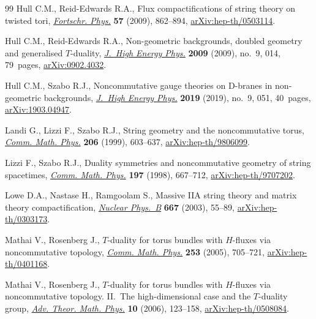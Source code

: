 \documentclass[10pt,a4paper]{amsart}
\numberwithin{equation}{section}
\begin{document}
\begin{thebibliography}{99}
Hull C.M., Reid-Edwards R.A., Flux compactifications of string theory on
 twisted tori, \href{https://doi.org/10.1002/prop.200900076}{\textit{Fortschr. Phys.}} \textbf{57} (2009), 862--894,
 \href{https://arxiv.org/abs/hep-th/0503114}{arXiv:hep-th/0503114}.

Hull C.M., Reid-Edwards R.A., Non-geometric backgrounds, doubled geometry and
 generalised {$T$}-duality, \href{https://doi.org/10.1088/1126-6708/2009/09/014}{\textit{J.~High Energy Phys.}} \textbf{2009}
 (2009), no.~9, 014, 79~pages, \href{https://arxiv.org/abs/0902.4032}{arXiv:0902.4032}.

Hull C.M., Szabo R.J., Noncommutative gauge theories on {D}-branes in
 non-geometric backgrounds, \href{https://doi.org/10.1007/jhep09(2019)051}{\textit{J.~High Energy Phys.}} \textbf{2019}
 (2019), no.~9, 051, 40~pages, \href{https://arxiv.org/abs/1903.04947}{arXiv:1903.04947}.

Landi G., Lizzi F., Szabo R.J., String geometry and the noncommutative torus,
 \href{https://doi.org/10.1007/s002200050839}{\textit{Comm. Math. Phys.}} \textbf{206} (1999), 603--637,
 \href{https://arxiv.org/abs/hep-th/9806099}{arXiv:hep-th/9806099}.

Lizzi F., Szabo R.J., Duality symmetries and noncommutative geometry of string
 spacetimes, \href{https://doi.org/10.1007/s002200050468}{\textit{Comm. Math. Phys.}} \textbf{197} (1998), 667--712,
 \href{https://arxiv.org/abs/hep-th/9707202}{arXiv:hep-th/9707202}.

Lowe D.A., Nastase H., Ramgoolam S., Massive {IIA} string theory and matrix
 theory compactification, \href{https://doi.org/10.1016/S0550-3213(03)00547-9}{\textit{Nuclear Phys.~B}} \textbf{667} (2003),
 55--89, \href{https://arxiv.org/abs/hep-th/0303173}{arXiv:hep-th/0303173}.

Mathai V., Rosenberg J., {$T$}-duality for torus bundles with {$H$}-fluxes via
 noncommutative topology, \href{https://doi.org/10.1007/s00220-004-1159-7}{\textit{Comm. Math. Phys.}} \textbf{253} (2005),
 705--721, \href{https://arxiv.org/abs/hep-th/0401168}{arXiv:hep-th/0401168}.

Mathai V., Rosenberg J., {$T$}-duality for torus bundles with {$H$}-fluxes via
 noncommutative topology. {II}.~{T}he high-dimensional case and the
 {$T$}-duality group, \href{https://doi.org/10.4310/ATMP.2006.v10.n1.a5}{\textit{Adv. Theor. Math. Phys.}} \textbf{10} (2006),
 123--158, \href{https://arxiv.org/abs/hep-th/0508084}{arXiv:hep-th/0508084}.


\end{thebibliography}
\end{document}
